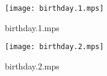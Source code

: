 \documentclass[letterpaper,10pt]{article}
\begin{document}
\begin{figure}
    \centering
    \texttt{[image: birthday.1.mps]}
    \caption{birthday.1.mps}
\end{figure}

\begin{figure}
    \centering
    \texttt{[image: birthday.2.mps]}
    \caption{birthday.2.mps}
\end{figure}
\end{document}
